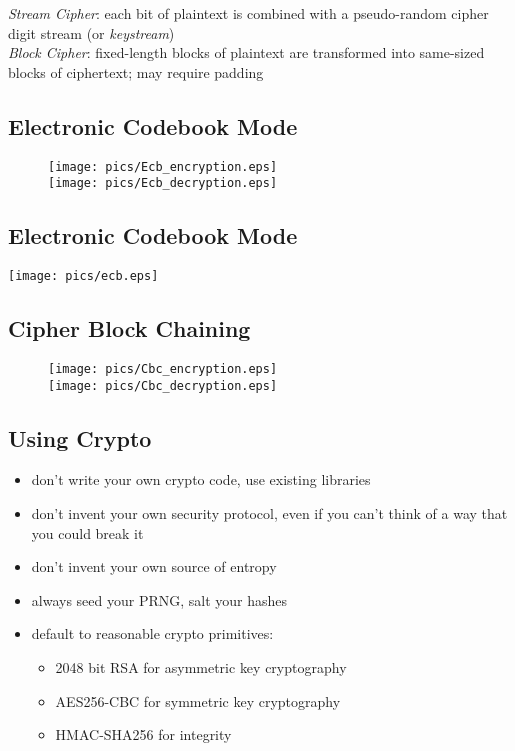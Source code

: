 \documentclass[xga]{xdvislides}
\begin{document}
{\em Stream Cipher}: each bit of plaintext is combined
with a pseudo-random cipher digit stream (or {\em keystream})
\\

{\em Block Cipher}: fixed-length blocks of plaintext
are transformed into same-sized blocks of ciphertext;
may require padding


\subsection{Electronic Codebook Mode}
\begin{figure}[hb]
    \begin{center}
        \texttt{[image: pics/Ecb\_encryption.eps]} \\
        \texttt{[image: pics/Ecb\_decryption.eps]} \\
    \end{center}
\end{figure}

\subsection{Electronic Codebook Mode}
\begin{center}
	\texttt{[image: pics/ecb.eps]}
\end{center}


\subsection{Cipher Block Chaining}
\begin{figure}[hb]
    \begin{center}
        \texttt{[image: pics/Cbc\_encryption.eps]} \\
        \texttt{[image: pics/Cbc\_decryption.eps]}
    \end{center}
\end{figure}

\subsection{Using Crypto}

\begin{itemize}
	\item don't write your own crypto code, use existing libraries
	\item don't invent your own security protocol,
		even if you can't think of a way that you could break it
	\item don't invent your own source of entropy
	\item always seed your PRNG, salt your hashes
	\item default to reasonable crypto primitives:
		\begin{itemize}
			\item 2048 bit RSA for asymmetric key cryptography
			\item AES256-CBC for symmetric key cryptography
			\item HMAC-SHA256 for integrity
		\end{itemize}
\end{itemize}
\end{document}
